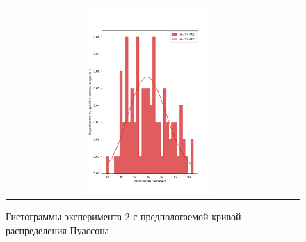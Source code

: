\documentclass[12pt,a4paper]{article}
\begin{document}
\begin{figure}[!ht]
\begin{tabular}{cc}
{\includegraphics[width=0.45\textwidth]{imgs/40.png}} 
\end{tabular}
\caption{Гистограммы эксперимента 2 с предпологаемой кривой распределения Пуассона}
\end{figure}

\newpage
\end{document}

